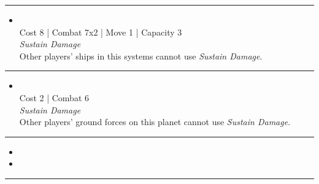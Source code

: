 \begin{multicols}{2}
\vspace{-10pt}\rule{\hsize}{0.4pt}\vspace{5pt}


\begin{itemize}
\item {}\\
Cost 8 | Combat 7x2 | Move 1 | Capacity 3 \\
\emph{Sustain Damage}\\
Other players' ships in this systems cannot use \emph{Sustain Damage}.
\end{itemize}

\vspace{-10pt}\rule{\hsize}{0.4pt}\vspace{5pt}


\begin{itemize}
\item {}
\\
Cost 2 | Combat 6 \\
\emph{Sustain Damage}\\
Other players' ground forces on this planet cannot use \emph{Sustain Damage}.
\end{itemize}

\vspace{-10pt}\rule{\hsize}{0.4pt}\vspace{5pt}

\nounits

\columnbreak
{}

\begin{itemize}
\item \salvageOperations
\item \mirrorComputing
\end{itemize}

\vspace{-10pt}\rule{\hsize}{0.4pt}\vspace{5pt}



\end{multicols}
